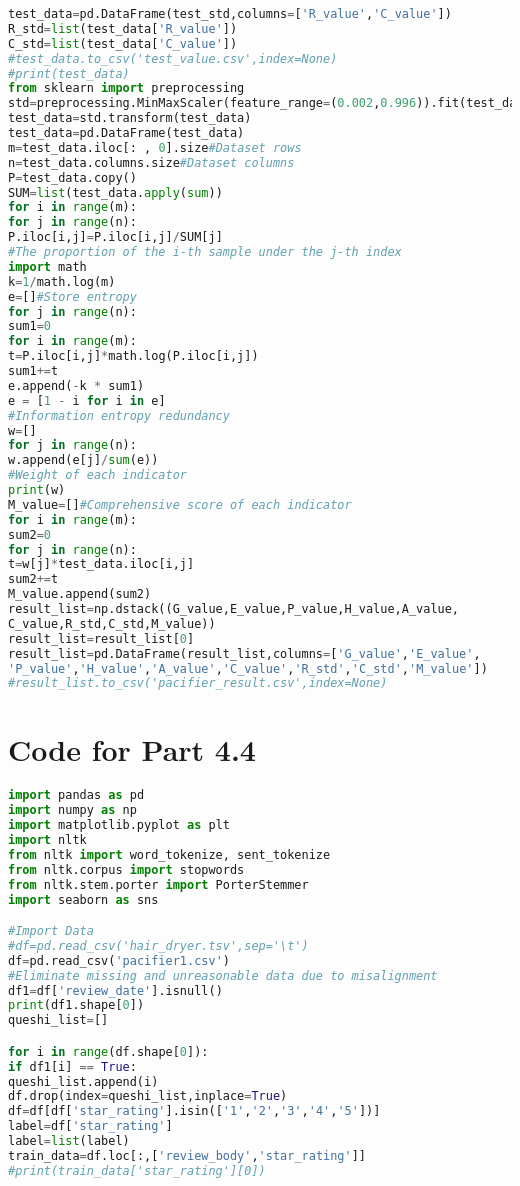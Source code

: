 \documentclass{mcmthesis}
\begin{document}
\begin{appendices}
\begin{lstlisting}[language=python]
test_data=pd.DataFrame(test_std,columns=['R_value','C_value'])
R_std=list(test_data['R_value'])
C_std=list(test_data['C_value'])
#test_data.to_csv('test_value.csv',index=None)
#print(test_data)
from sklearn import preprocessing
std=preprocessing.MinMaxScaler(feature_range=(0.002,0.996)).fit(test_data)
test_data=std.transform(test_data)
test_data=pd.DataFrame(test_data)
m=test_data.iloc[: , 0].size#Dataset rows
n=test_data.columns.size#Dataset columns
P=test_data.copy()
SUM=list(test_data.apply(sum))
for i in range(m):
for j in range(n):
P.iloc[i,j]=P.iloc[i,j]/SUM[j]
#The proportion of the i-th sample under the j-th index
import math
k=1/math.log(m)
e=[]#Store entropy
for j in range(n):
sum1=0
for i in range(m):
t=P.iloc[i,j]*math.log(P.iloc[i,j])
sum1+=t
e.append(-k * sum1)
e = [1 - i for i in e]
#Information entropy redundancy
w=[]
for j in range(n):
w.append(e[j]/sum(e))
#Weight of each indicator
print(w)
M_value=[]#Comprehensive score of each indicator
for i in range(m):
sum2=0
for j in range(n):
t=w[j]*test_data.iloc[i,j]
sum2+=t
M_value.append(sum2)
result_list=np.dstack((G_value,E_value,P_value,H_value,A_value,
C_value,R_std,C_std,M_value))
result_list=result_list[0]
result_list=pd.DataFrame(result_list,columns=['G_value','E_value',
'P_value','H_value','A_value','C_value','R_std','C_std','M_value'])
#result_list.to_csv('pacifier_result.csv',index=None)


\end{lstlisting}
\label{Appen1}

\section{Code for Part 4.4}
\begin{lstlisting}[language=python]
import pandas as pd
import numpy as np
import matplotlib.pyplot as plt
import nltk
from nltk import word_tokenize, sent_tokenize
from nltk.corpus import stopwords
from nltk.stem.porter import PorterStemmer
import seaborn as sns

#Import Data
#df=pd.read_csv('hair_dryer.tsv',sep='\t')
df=pd.read_csv('pacifier1.csv')
#Eliminate missing and unreasonable data due to misalignment
df1=df['review_date'].isnull()
print(df1.shape[0])
queshi_list=[]

for i in range(df.shape[0]):
if df1[i] == True:
queshi_list.append(i)
df.drop(index=queshi_list,inplace=True)
df=df[df['star_rating'].isin(['1','2','3','4','5'])]
label=df['star_rating']
label=list(label)
train_data=df.loc[:,['review_body','star_rating']]
#print(train_data['star_rating'][0])


\end{lstlisting}
\end{appendices}
\end{document}
